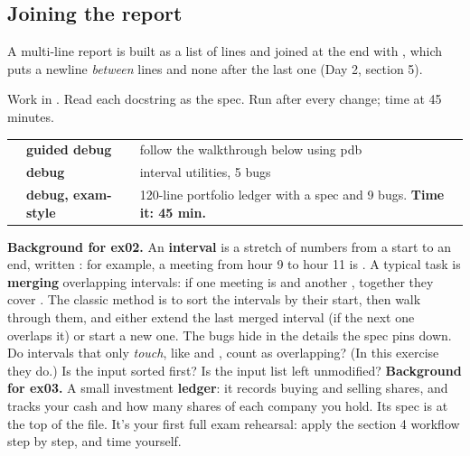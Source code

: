 \documentclass[10pt,a4paper]{article}
\begin{document}
\subsection{Joining the report}
A multi-line report is built as a list of lines and joined at the end with , which puts a newline \emph{between} lines and none after the last one (Day 2, section 5).
\begin{practicebox}
Work in . Read each docstring as the spec. Run  after every change; time  at 45 minutes.
\end{practicebox}
\begin{datatable}{}{\footnotesize}
\begin{xltabular}{\linewidth}{@{}Y{1.33}Y{0.58}Y{1.09}@{}}
 &  &  \\ \hline
\endhead
{} & \textbf{guided debug} & follow the walkthrough below using pdb \\
 & \textbf{debug} & interval utilities, 5 bugs \\
 & \textbf{debug, exam-style} & 120-line portfolio ledger with a spec and 9 bugs. \textbf{Time it: 45 min.} \\
\hline
\end{xltabular}
\end{datatable}
\textbf{Background for ex02.} An \textbf{interval} is a stretch of numbers from a start to an end, written : for example, a meeting from hour 9 to hour 11 is \code{[9,\allowbreak{}\ 11]}. A typical task is \textbf{merging} overlapping intervals: if one meeting is \code{[1,\allowbreak{}\ 3]} and another \code{[2,\allowbreak{}\ 5]}, together they cover \code{[1,\allowbreak{}\ 5]}. The classic method is to sort the intervals by their start, then walk through them, and either extend the last merged interval (if the next one overlaps it) or start a new one. The bugs hide in the details the spec pins down. Do intervals that only \emph{touch}, like \code{[1,\allowbreak{}\ 3]} and \code{[3,\allowbreak{}\ 5]}, count as overlapping? (In this exercise they do.) Is the input sorted first? Is the input list left unmodified?
\textbf{Background for ex03.} A small investment \textbf{ledger}: it records buying and selling shares, and tracks your cash and how many shares of each company you hold. Its spec is at the top of the file. It’s your first full exam rehearsal: apply the section 4 workflow step by step, and time yourself.
\end{document}
